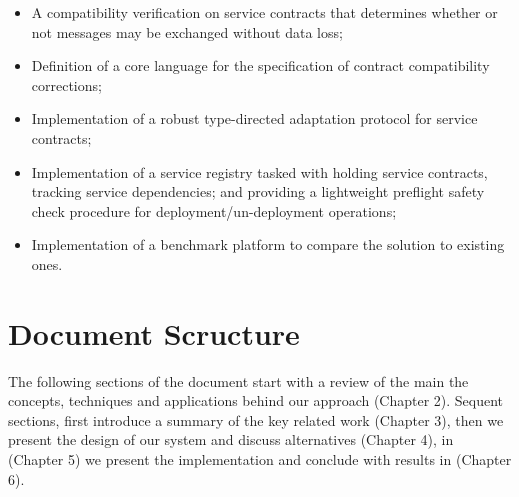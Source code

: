 \begin{itemize}
    \item A compatibility verification on service contracts that determines whether or not messages may be exchanged without data loss;
    \item Definition of a core language for the specification of contract compatibility corrections;
    \item Implementation of a robust type-directed adaptation protocol for service contracts;
    \item Implementation of a service registry tasked with holding service contracts, tracking service dependencies;
    and providing a lightweight preflight safety check procedure for deployment/un-deployment operations;
    \item Implementation of a benchmark platform to compare the solution to existing ones.
\end{itemize}

\section{Document Scructure} %
\label{sec:document_structure}

The following sections of the document start with a review of the main the concepts,
techniques and applications behind our approach (Chapter 2).
Sequent sections, first introduce a summary of the key related work (Chapter 3), then we present the design of our system and discuss alternatives (Chapter 4),
in (Chapter 5) we present the implementation and conclude with results in (Chapter 6).